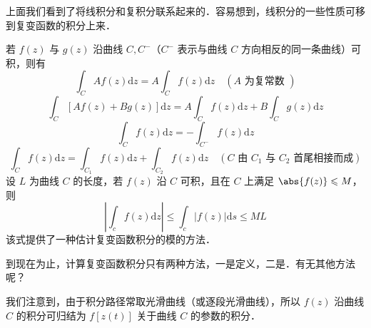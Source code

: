 上面我们看到了将线积分和复积分联系起来的．容易想到，线积分的一些性质可移到复变函数的积分上来．

若 $f(z)$ 与 $g(z)$ 沿曲线 $C,C^-$（$C^-$ 表示与曲线 $C$ 方向相反的同一条曲线）可积，则有
\begin{equation}
\int_{C} A f(z) \mathrm{d} z=A \int_{C} f(z) \mathrm{d} z \quad(A \text { 为复常数 })
\end{equation}
\begin{equation}
\int_{C}[Af(z)+ Bg(z)] \mathrm{d} z= A\int_{C} f(z) \mathrm{d} z + B\int_{C} g(z) \mathrm{d} z
\end{equation}
\begin{equation} 
\int_{C} f(z) \mathrm{d} z=-\int_{C^{-}} f(z) \mathrm{d} z
\end{equation}
\begin{equation}
\int_{C} f(z) \mathrm{d} z=\int_{C_{1}} f(z) \mathrm{d} z+\int_{C_{2}} f(z) \mathrm{d} z \quad\left(C \text{ 由 } C_{1} \text{ 与 } C_{2} \text { 首尾相接而成}\right)
\end{equation}
设 $ L$ 为曲线 $C$ 的长度，若 $f (z)$ 沿 $C$ 可积，且在 $C$ 上满足 $\abs{f(z)} \leqslant M $，则
\begin{equation} \label{CpxInt_eq2}
\left|\int_{c} f(z) \mathrm{d} z\right| \leqslant \int_{c}|f(z)| \mathrm{d} s \leqslant M L
\end{equation}
该式提供了一种估计复变函数积分的模的方法．


到现在为止，计算复变函数积分只有两种方法，一是定义，二是．有无其他方法呢？

我们注意到，由于积分路径常取光滑曲线（或逐段光滑曲线），所以 $ f (z) $ 沿曲线 $C $ 的积分可归结为 $f [z(t)]$ 关于曲线 $C$ 的参数的积分．

